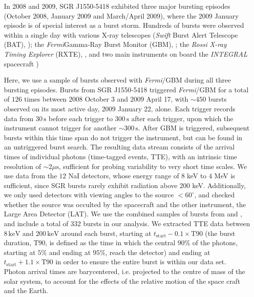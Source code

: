 \documentclass[12pt]{emulateapj}
\newcommand{\project}[1]{\textsl{#1}}
\newcommand{\fermi}{\project{Fermi}}
\begin{document}
In 2008 and 2009, SGR J1550-5418 exhibited three major bursting episodes (October 2008, January 2009 and March/April 2009), where the 2009 January episode is of special interest as a
burst storm. Hundreds of bursts were observed within a single day with various X-ray telescopes ({\it Swift} Burst Alert Telescope (BAT), \citealp{israel2010, scholz2011}); the \fermi Gamma-Ray Burst Monitor (GBM), \citealp{kaneko2010,vonkienlin2012,vanderhorst2012}; the {\it Rossi X-ray Timing Explorer} (RXTE), \citep{dib2012}, and two main instruments on board the {\it INTEGRAL} spacecraft \citealp{mereghetti2009, savchenko2010})
 
Here, we use a sample of bursts observed with {\it Fermi}/GBM during all three bursting episodes. Bursts from SGR J1550-5418 triggered \fermi/GBM for a total of $126$ 
times between 2008 October 3 and 2009 April 17, with $\sim 450$ bursts observed on its most active day, 2009 January 22, alone. 
Each trigger records data from $30\,\mathrm{s}$ before each trigger to $300\,\mathrm{s}$ after each trigger, upon which the instrument cannot trigger for another $\sim 300 \,\mathrm{s}$. 
After GBM is triggered, subsequent bursts within this time span do not trigger the instrument, but can be found in an untriggered burst search. The resulting data stream consists of 
the arrival times of individual photons (time-tagged events, TTE), with an intrinsic time resolution of $\sim 2\mu\mathrm{s}$, sufficient for probing variability to very short time scales.
We use data from the $12$ NaI detectors, whose energy range of $8$ keV to $4$ MeV is sufficient, since SGR bursts rarely exhibit radiation above $200$ keV. Additionally, we only used detectors with viewing angles to the source $< 60^{\circ}$, and checked whether the source was occulted by the spacecraft and the other instrument, the Large Area Detector (LAT). We use the combined samples of bursts from \citet{vonkienlin2012} and \citet{vanderhorst2012}, and include a total of $332$ bursts in our analysis.
We extracted TTE data between $8 \, \mathrm{keV}$ and $200 \, \mathrm{keV}$ around each burst, starting at $t_{\mathrm{start}} - 0.1 \times\mathrm{T}90$ (the burst duration, $\mathrm{T}90$, is defined as the time in which the central $90\%$ of the photons, starting at $5\%$ and ending at $95\%$, reach the detector) and ending at $t_{\mathrm{start}} + 1.1\times\mathrm{T}90$ in order to ensure the entire burst is within our data set. Photon arrival times are barycentered, i.e. projected to the centre of mass of the solar system, to account for the effects of the relative motion of the space craft and the Earth.
\end{document}

